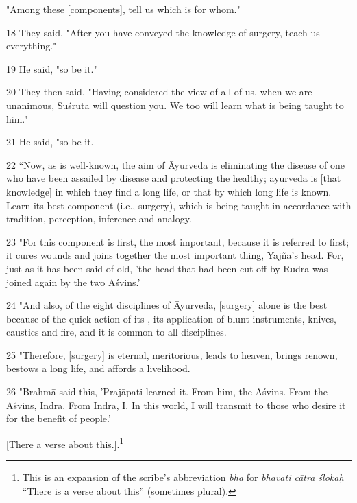 \begin{translation}
    "Among these [components], tell us which is for whom."
    
    \item[18] They said, "After you have conveyed the knowledge of surgery, 
    teach 
    us everything."
    
    \item[19] He said, "so be it."
    
    \item[20] They then said, "Having considered the view of all of us, when we 
    are 
    unanimous, Suśruta will question you. We too will learn what is being taught to 
    him."
    
    \item[21] He said, "so be it.
    
    \item[22] “Now, as is well-known, the aim of Āyurveda is eliminating the 
    disease of one who have been assailed by disease and protecting the healthy;  
    āyurveda is [that knowledge] in which they find a long life, or that by which 
    long life is known. Learn its best component (i.e., surgery), which is being 
    taught in accordance with tradition, perception, inference and analogy.
    
    \item[23] "For this component is first, the most important, because it is 
    referred to first; it cures wounds and joins together the most important thing, 
    Yajña's head. For, just as it has been said of old, 'the head that had been cut off 
    by Rudra was joined again by the two Aśvins.'
    
    \item[24] "And also, of the eight disciplines of Āyurveda, [surgery] alone is 
    the best because of the quick action of its , its 
    application of blunt 
    instruments, knives, caustics and fire, and it is common to all disciplines.
    
    \item[25] "Therefore, [surgery] is eternal, meritorious, leads to heaven, 
    brings renown, bestows a long life, and affords a livelihood.
    
    \item[26] "Brahmā said this, 'Prajāpati learned it. From him, the Aśvins. From 
    the Aśvins, 
    Indra. From Indra, I. In this world, I will transmit to those who desire it for the benefit of 
    people.' 
    
    [There a verse about this.].\footnote{This is an expansion 
    of the scribe's abbreviation \emph{bha} for \emph{bhavati cātra ślokaḥ} 
    “There is a verse about this” (sometimes plural).\label{bha}}
    

\end{translation}
